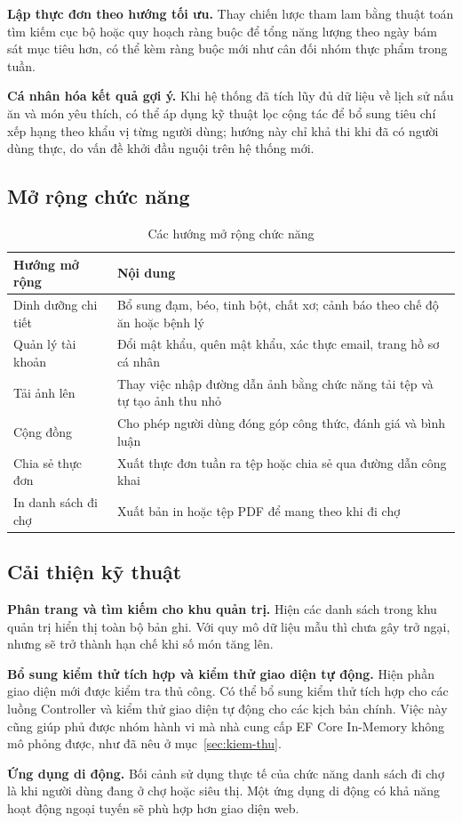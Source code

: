 \textbf{Lập thực đơn theo hướng tối ưu.} Thay chiến lược tham lam bằng thuật
toán tìm kiếm cục bộ hoặc quy hoạch ràng buộc để tổng năng lượng theo ngày bám
sát mục tiêu hơn, có thể kèm ràng buộc mới như cân đối nhóm thực phẩm trong tuần.

\textbf{Cá nhân hóa kết quả gợi ý.} Khi hệ thống đã tích lũy đủ dữ liệu về lịch
sử nấu ăn và món yêu thích, có thể áp dụng kỹ thuật lọc cộng tác để bổ sung tiêu
chí xếp hạng theo khẩu vị từng người dùng; hướng này chỉ khả thi khi đã có người
dùng thực, do vấn đề khởi đầu nguội trên hệ thống mới.

\subsection{Mở rộng chức năng}

\begin{table}[H]
\centering
\caption{Các hướng mở rộng chức năng}
\label{tab:mo-rong}
\begin{tabularx}{\textwidth}{|P{4.2cm}|Y|}
\hline
\bfseries Hướng mở rộng & \bfseries Nội dung \\ \hline
Dinh dưỡng chi tiết & Bổ sung đạm, béo, tinh bột, chất xơ; cảnh báo theo chế độ
  ăn hoặc bệnh lý \\ \hline
Quản lý tài khoản & Đổi mật khẩu, quên mật khẩu, xác thực email, trang hồ
  sơ cá nhân \\ \hline
Tải ảnh lên & Thay việc nhập đường dẫn ảnh bằng chức năng tải tệp và tự tạo ảnh
  thu nhỏ \\ \hline
Cộng đồng & Cho phép người dùng đóng góp công thức, đánh giá và bình
  luận \\ \hline
Chia sẻ thực đơn & Xuất thực đơn tuần ra tệp hoặc chia sẻ qua đường dẫn công
  khai \\ \hline
In danh sách đi chợ & Xuất bản in hoặc tệp PDF để mang theo khi đi chợ \\ \hline
\end{tabularx}
\end{table}

\subsection{Cải thiện kỹ thuật}

\textbf{Phân trang và tìm kiếm cho khu quản trị.} Hiện các danh sách trong khu
quản trị hiển thị toàn bộ bản ghi. Với quy mô dữ liệu mẫu thì chưa gây trở ngại,
nhưng sẽ trở thành hạn chế khi số món tăng lên.

\textbf{Bổ sung kiểm thử tích hợp và kiểm thử giao diện tự động.} Hiện phần giao
diện mới được kiểm tra thủ công. Có thể bổ sung kiểm thử tích hợp cho các luồng
Controller và kiểm thử giao diện tự động cho các kịch bản chính. Việc này cũng
giúp phủ được nhóm hành vi mà nhà cung cấp EF Core In-Memory không mô phỏng được,
như đã nêu ở mục~\ref{sec:kiem-thu}.

\textbf{Ứng dụng di động.} Bối cảnh sử dụng thực tế của chức năng danh sách đi
chợ là khi người dùng đang ở chợ hoặc siêu thị. Một ứng dụng di động có khả năng
hoạt động ngoại tuyến sẽ phù hợp hơn giao diện web.
